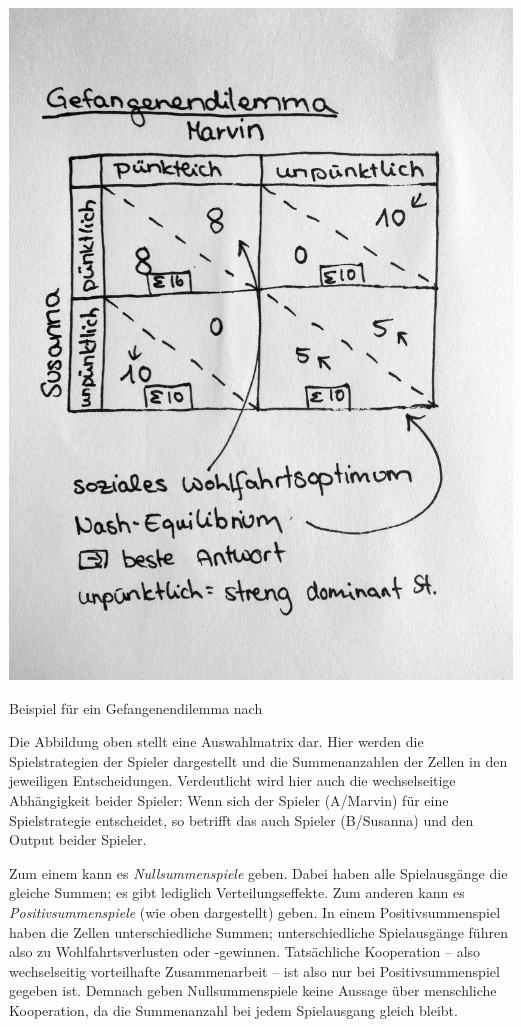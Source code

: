 \begin{dsafigure}
	\begin{center}
	\includegraphics[width=0.9\columnwidth]{img/gefangendilemma.jpg}
	\caption{Beispiel für ein Gefangenendilemma nach \cite{Kleinberg-2009-oz}}
	\label{fig:gefangenendilemma}
	\end{center}
\end{dsafigure}

Die Abbildung oben stellt eine Auswahlmatrix dar.
Hier werden die Spielstrategien der Spieler dargestellt und die Summenanzahlen der Zellen in den jeweiligen Entscheidungen.
Verdeutlicht wird hier auch die wechselseitige Abhängigkeit beider Spieler: Wenn sich der Spieler (A/Marvin) für eine Spielstrategie entscheidet, so betrifft das auch Spieler (B/Susanna) und den Output beider Spieler.

Zum einem kann es \emph{Nullsummenspiele} geben.
Dabei haben alle Spielausgänge die gleiche Summen; es gibt lediglich Verteilungseffekte.
Zum anderen kann es \emph{Positivsummenspiele} (wie oben dargestellt) geben.
In einem Positivsummenspiel haben die Zellen unterschiedliche Summen; unterschiedliche Spielausgänge führen also zu Wohlfahrtsverlusten oder -gewinnen.
Tatsächliche Kooperation -- also wechselseitig vorteilhafte Zusammenarbeit -- ist also nur bei Positivsummenspiel gegeben ist.
Demnach geben Nullsummenspiele keine Aussage über menschliche Kooperation, da die Summenanzahl bei jedem Spielausgang gleich bleibt.

